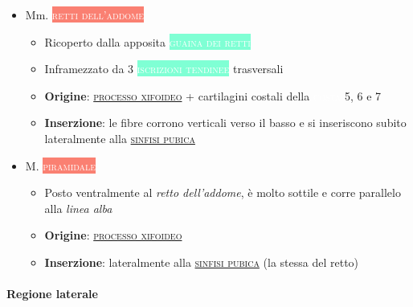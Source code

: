 \documentclass[italian,]{article}
\providecommand{\tightlist}{%
  \setlength{\itemsep}{0pt}\setlength{\parskip}{0pt}}
\newcommand{\mus}[1]{\colorbox{Salmon}{\textcolor{white}{\textsc{#1}}}}
\newcommand{\oss}[1]{\colorbox{ossa}{\textcolor{white}{\textsc{#1}}}}
\newcommand{\tol}[1]{\colorbox{Aquamarine}{\textcolor{white}{\textsc{#1}}}}
\renewcommand{\a}[1]{\underline{\textsc{#1}}}
\begin{document}
\begin{itemize}
\tightlist
\item
  Mm. \mus{retti dell'addome}~

  \begin{itemize}
  \tightlist
  \item
    Ricoperto dalla apposita \tol{guaina dei retti}
  \item
    Inframezzato da 3 \tol{iscrizioni tendinee} trasversali
  \item
    \textbf{Origine}: \a{processo xifoideo} + cartilagini costali della
    \oss{costa} 5, 6 e 7
  \item
    \textbf{Inserzione}: le fibre corrono verticali verso il basso e si
    inseriscono subito lateralmente alla \a{sinfisi pubica}
  \end{itemize}
\item
  M. \mus{piramidale}~

  \begin{itemize}
  \tightlist
  \item
    Posto ventralmente al \emph{retto dell'addome}, è molto sottile e
    corre parallelo alla \emph{linea alba}
  \item
    \textbf{Origine}: \a{processo xifoideo}
  \item
    \textbf{Inserzione}: lateralmente alla \a{sinfisi pubica} (la stessa
    del retto)
  \end{itemize}
\end{itemize}

\hypertarget{regione-laterale}{%
\paragraph{Regione laterale}\label{regione-laterale}}
\end{document}
